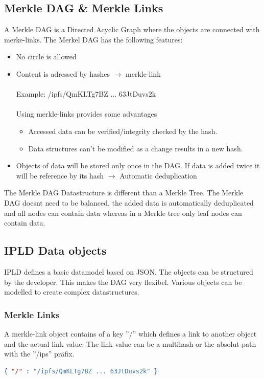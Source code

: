 \documentclass[a4paper,11pt, oneside]{report}
\theoremstyle{definition}
\begin{document}
\subsection{Merkle DAG \& Merkle Links}
A Merkle DAG is a Directed Acyclic Graph where the objects are connected with merke-links. The Merkel DAG has the following features:
\begin{itemize}
\item No circle is allowed
\item Content is adressed by hashes $\rightarrow$  merkle-link\\ \\
Example:  /ipfs/QmKLTg7BZ ... 63JtDuvs2k\\ \\
Using merkle-links provides some advantages
\begin{itemize}
\item Accessed data can be verified/integrity checked by the hash.  
\item Data structures can't be modified as a change results in a new hash.
\end{itemize}
\item Objects of data will be stored only once in the DAG. If data is added twice it will be reference by its hash $\rightarrow$ Automatic deduplication
\end{itemize}
The Merkle DAG Datastructure is different than a Merkle Tree. The Merkle DAG doesnt need to be balanced, the added data is automatically deduplicated and all nodes can contain data whereas in a Merkle tree only leaf nodes can contain data.

\newpage

\subsection{IPLD Data objects}
IPLD defines a basic datamodel based on JSON. The objects can be structured by the developer. This makes the DAG very flexibel. Various objects can be modelled to create complex datastructures.

\subsubsection{Merkle Links}
A merkle-link object contains of a key ''/'' which defines a link to another object and the actual link value. The link value can be a multihash or the absolut path with the ''/ips'' präfix. 
\begin{lstlisting}[language=json]
{ "/" : "/ipfs/QmKLTg7BZ ... 63JtDuvs2k" }
\end{lstlisting}
\end{document}
